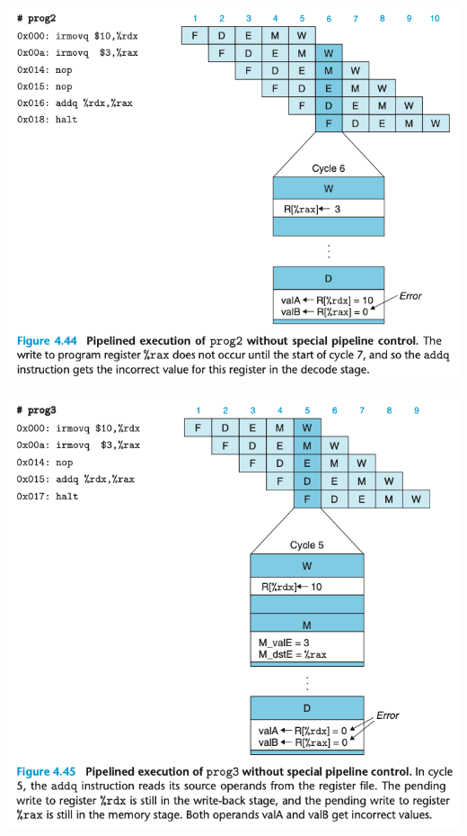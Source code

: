 \documentclass[11pt]{article}
\begin{document}
\begin{center}
\includegraphics[width=.9\linewidth]{pics/figure4.44.png}
\end{center}

\begin{center}
\includegraphics[width=.9\linewidth]{pics/figure4.45.png}
\end{center}
\end{document}
